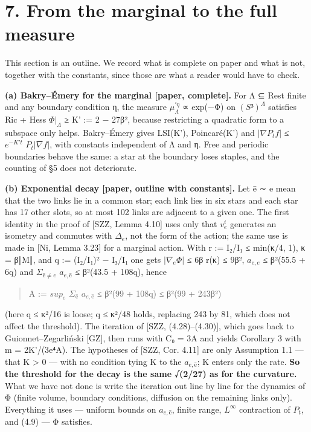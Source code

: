 \documentclass[11pt,a4paper]{article}
\theoremstyle{named}
\begin{document}
\section*{7. From the marginal to the full measure}
This section is an outline. We record what is complete on paper and what is not, together with the constants, since those are what a reader would have to check.

\textbf{(a) Bakry–Émery for the marginal [paper, complete].} For Λ ⊆ Rest finite and any boundary condition η, the measure $μ^{\prime η}_{Λ}$ ∝ exp(−Φ) on $(S³)^{Λ}$ satisfies Ric + Hess $Φ|_{Λ}$ ≥ K' := 2 − 27β², because restricting a quadratic form to a subspace only helps. Bakry–Émery gives LSI(K'), Poincaré(K') and $|∇P_tf|$ ≤ $e^{−K't}$ $P_t|∇f|$, with constants independent of Λ and η. Free and periodic boundaries behave the same: a star at the boundary loses staples, and the counting of §5 does not deteriorate.

\textbf{(b) Exponential decay [paper, outline with constants].} Let ē ∼ e mean that the two links lie in a common star; each link lies in six stars and each star has 17 other slots, so at most 102 links are adjacent to a given one. The first identity in the proof of [SZZ, Lemma 4.10] uses only that $v_e^i$ generates an isometry and commutes with $Δ_e$, not the form of the action; the same use is made in [Ni, Lemma 3.23] for a marginal action. With r := I₂/I₁ ≤ min(κ/4, 1), κ = β‖M‖, and q := (I₂/I₁)² − I₃/I₁ one gets $|∇_eΦ|$ ≤ 6β r(κ) ≤ 9β², $a_{e,e}$ ≤ β²(55.5 + 6q) and $Σ_{ē ≠ e}$ $a_{e,ē}$ ≤ β²(43.5 + 108q), hence

\begin{quote}
A := $sup_e$ $Σ_{ē}$ $a_{e,ē}$ ≤ β²(99 + 108q) ≤ β²(99 + 243β²)
\end{quote}
(here q ≤ κ²/16 is loose; q ≤ κ²/48 holds, replacing 243 by 81, which does not affect the threshold). The iteration of [SZZ, (4.28)–(4.30)], which goes back to Guionnet–Zegarliński [GZ], then runs with C₀ = 3A and yields Corollary 3 with m = 2K'/(3e⁴A). The hypotheses of [SZZ, Cor. 4.11] are only Assumption 1.1 — that K \textgreater{} 0 — with no condition tying K to the $a_{e,ē}$; K enters only the rate. \textbf{So the threshold for the decay is the same √(2/27) as for the curvature.} What we have not done is write the iteration out line by line for the dynamics of Φ (finite volume, boundary conditions, diffusion on the remaining links only). Everything it uses — uniform bounds on $a_{e,ē}$, finite range, $L^{∞}$ contraction of $P_t$, and (4.9) — Φ satisfies.
\end{document}
